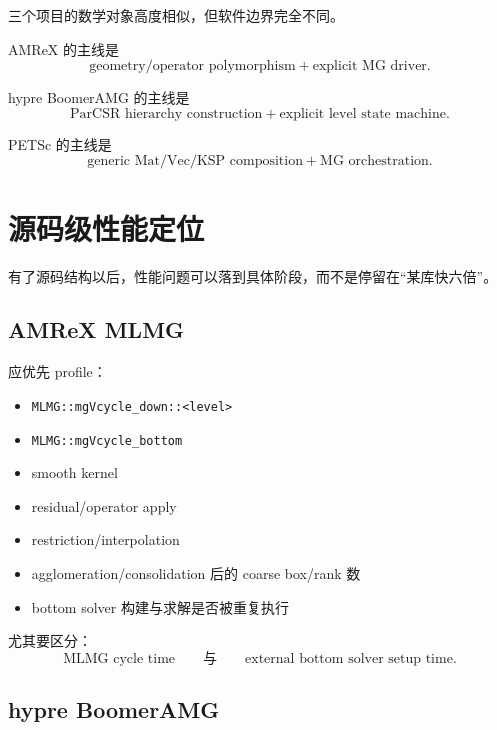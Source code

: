 三个项目的数学对象高度相似，但软件边界完全不同。

AMReX 的主线是
\begin{equation}
\boxed{
\text{geometry/operator polymorphism}
+
\text{explicit MG driver}.
}
\end{equation}

hypre BoomerAMG 的主线是
\begin{equation}
\boxed{
\text{ParCSR hierarchy construction}
+
\text{explicit level state machine}.
}
\end{equation}

PETSc 的主线是
\begin{equation}
\boxed{
\text{generic Mat/Vec/KSP composition}
+
\text{MG orchestration}.
}
\end{equation}

\section{源码级性能定位}

有了源码结构以后，性能问题可以落到具体阶段，而不是停留在“某库快六倍”。

\subsection{AMReX MLMG}

应优先 profile：

\begin{itemize}
\item \texttt{MLMG::mgVcycle\_down::<level>}
\item \texttt{MLMG::mgVcycle\_bottom}
\item smooth kernel
\item residual/operator apply
\item restriction/interpolation
\item agglomeration/consolidation 后的 coarse box/rank 数
\item bottom solver 构建与求解是否被重复执行
\end{itemize}

尤其要区分：
\begin{equation}
\text{MLMG cycle time}
\qquad\text{与}\qquad
\text{external bottom solver setup time}.
\end{equation}

\subsection{hypre BoomerAMG}

